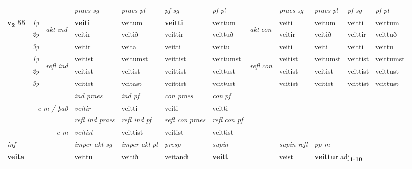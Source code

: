 \begin{longtable}[l]{X>{\footnotesize\itshape}llXXXXlXXXX}
 & &   & \textit{praes sg}  & \textit{praes pl}    & \textit{ pf sg} & \textit{pf pl} & & \textit{praes sg}  & \textit{praes pl}    & \textit{pf sg} & \textit{pf pl }  \\ \cmidrule{4-7} \cmidrule{9-12}
 \multirow{2}{*}{{{\textbf{v{\textsubscript{2}}} \Large{\textbf{55}}}}}  & 1p & \multirow{3}{*}{\begin{turn}{90}\textit{akt ind}\end{turn}} & \textbf{veiti} & veitum & \textbf{veitti} & veittum & \multirow{3}{*}{\begin{turn}{90}\textit{akt con}\end{turn}} &veiti & veitum & veitti & veittum\\*
 & 2p &  &  veitir  & veitið & veittir & veittuð & & veitir & veitið & veittir & veittuð \\*
 & 3p &  & veitir & veita & veitti & veittu & & veiti & veiti& veitti & veittu \\*
\cmidrule{4-7} \cmidrule{9-12}
 & 1p & \multirow{3}{*}{\begin{turn}{90}\textit{refl ind}\end{turn}}  & veitist & veitumst & veittist & veittumst & \multirow{3}{*}{\begin{turn}{90}\textit{refl con}\end{turn}}  &veitist & veitumst & veittist & veittumst \\*
 & 2p &  & veitist & veitist & veittist & veittust & &veitist & veitist & veittist & veittust \\*
 & 3p  & & veitist & veitast & veittist & veittust & & veitist & veitist& veittist & veittust \\*
\cmidrule{4-7} \cmidrule{9-12}

   && &  \textit{ind praes} & \textit{ind pf} & \textit{con praes} & \textit{con pf} \\*
\multicolumn{3}{r}{\textit{e-m / það}} & veitir & veitti & veiti & veitti \\*

\cmidrule{4-7}
 & && \textit{refl ind praes} & \textit{refl ind pf} & \textit{refl con praes} & \textit{refl con pf} \\*
\multicolumn{3}{r}{\textit{e-m}}& veitist & veittist & veitist & veittist \\*

\cmidrule{4-7}
   {\textit{inf}} & &  & \textit{imper akt sg} & \textit{imper akt pl}   & \textit{presp} & \textit{supin} && \textit{supin refl} & \textit{pp m} \\*
  {\textbf{veita}} & && veittu  & veitið   & veitandi &  \textbf{veitt} && veist & \multicolumn{2}{l}{\textbf{veittur} adj\textbf{\textsubscript{1-10}}} \\*


\end{longtable}
